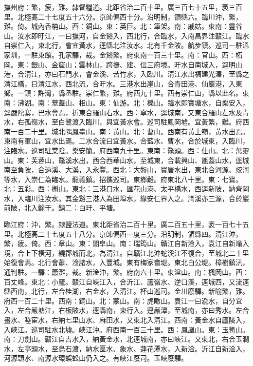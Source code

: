 \begin{pinyinscope}
撫州府：繁，疲，難。隸督糧道。北距省治二百十里。廣三百七十五里，袤三百里。北極高二十七度五十六分。京師偏西十分。沿明制，領縣六。臨川沖，繁，難。倚。城內香柟山。西：銅山。東：英巨。北：筆架。南：戚姑。東南：靈谷山。汝水即旴江，一曰撫河，自金谿入，西北行，合臨水，入南昌界注贛江。臨水自崇仁入，東北行，會宜黃水，逕縣北注汝水。北有千金陂。航步鎮。巡司一駐溫家圳，一駐東館。孔家驛，裁。金谿繁。府東南一百三十里。南：官山。西：柘岡。東：銀山、金窟山；雲林山，跨撫、建、信三府境。旴水自南城入，逕明山港，合清江，亦曰石門水，會金溪、苦竹水，入臨川。清江水出福建光澤，至縣之清江橋，曰清江水，西北流，合旴水。三港水出崖山，合青田港、仙巖港，入東鄉。一鎮：許灣，縣丞駐。崇仁繁，難。府西九十里。西有崇仁山，縣以此名。東南：沸湖。南：華蓋山、相山。東：仙游。北：櫟山。臨水即寶塘水，自樂安入，逕嚴陀寨，巴水會焉，折東合羅山右水。西：寧水，逕城南，又東合羅山左水及青水，右孤嶺水，至白鷺渡入臨川，與宜黃水會。巡司駐鳳岡墟。宜黃繁，難。府西南一百二十里。城北隅鳳臺山。南：黃山。北：曹山。西南有黃土嶺，黃水出焉。東南有軍山，宜水出焉。二水合流曰宜黃水。合藍水、曹水，合於城東，入臨川，注臨水。巡司駐棠陰。樂安簡。府西南九十里。東南：鼇頭。西：仕山。北：萬靈山。東：芙蓉山，鼇溪水出，西合西華山水，至城東，合載興山、甑蓋山水，逕城南至負陂，合遠溪、大溪，入永豐。西北：大盤山，寶唐水出，東北合河源、蛟河等水，入崇仁為臨水。龍義鎮。招攜巡司。東鄉難。府東北八十里。東：七寶。北：五彩。西：槲山。東北：三港口水，匯花山港、太平橋水，西逕新陂，納齊岡水，入臨川注汝水。其金谿三港入為田埠水，緣安仁界入之。潤溪亦三源，合於巖前陂，北入餘干。鎮二：白玕、平塘。

臨江府：沖，繁。隸鹽法道。東北距省治二百十里。廣二百五十里，袤一百七十五里。北極高二十七度五十八分。京師偏西一度三分。沿明制，領縣四。清江沖，繁，疲。倚。西：章山。東：閤皁山。南：瑞筠山。贛江自新淦入，袁江自新喻入境，合上下橫河，繞郡城而北，為清江。自贛江北沖蛇溪江不復合，至城北二十里始復會焉。北行會蕭、淦諸水，入豐城。東有梅家畬堤。東北白公堤。樟樹鎮汛，通判駐。一驛：蕭灘，裁。新淦沖，繁。府南六十里。東湓山。南：楓岡山。西：百丈峰。東北：小廬。贛江自峽江入，合沂江、蘆嶺水、逆口溪，逕城西，又流逕縣西南，北行，左合桂湖，右金水，入清江。杯山巡司。金川廢驛。新喻繁，難。府西一百二十里。西南：銅山。北：蒙山。南：虎瞰山。袁江一曰渝水，自分宜入，左合嚴塘江，右板陂水，逕縣南，東行入。逕嚴潭，至城南，亦曰秀水。左合畫水、睦宦水，右納七里山水、麻田水，又東北入清江。西南：黃金水自廬陵入，入峽江。巡司駐水北墟。峽江沖。府西南一百三十里。西：鳳凰山。東：玉笥山。南：刀劍山。贛江自吉水入，納黃金水，北逕城南，亦曰峽江。又東北，右合玉澗水，左亭頭水，至烏石渡，納水匽水、象水、蓮花潭水，入新淦。沂江自新淦入，河源頭水、南源水環蜈蚣山仍入之。有峽江廢司。玉峽廢驛。


\end{pinyinscope}
